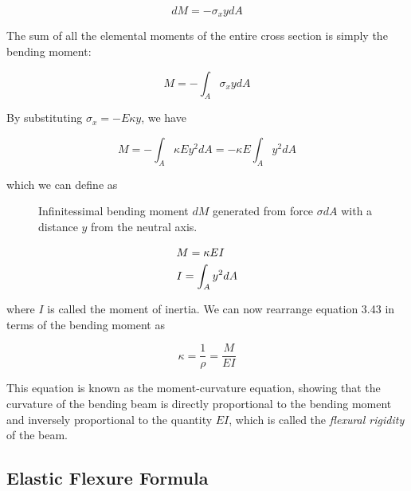 \documentclass[
10pt,
a4paper,
openany,
svgnames,
]{book} %
\begin{document}
\[dM =  - {\sigma _x}ydA\]

The sum of all the elemental moments of the entire cross section is simply the bending moment:

\[M =  - \int_A {{\sigma _x}ydA} \]

By substituting $\sigma_x = -E\kappa y$, we have

\[M =  - \int_A {\kappa E{y^2}dA}  =  - \kappa E\int_A {{y^2}dA} \]

which we can define as

\begin{figure}[h]
  \centering
  \caption{Infinitessimal bending moment $dM$ generated from force $\sigma dA$ with a distance $y$ from the neutral axis.}
\end{figure}


\[\begin{gathered}
  M = \kappa EI \hfill \\
  I = \int_A {{y^2}dA}  \hfill \\ 
\end{gathered} \]

where $I$ is called the moment of inertia. We can now rearrange equation 3.43 in terms of the bending moment as

\begin{equation} \label{eqn: moment-curvature}
  \kappa  = \frac{1}{\rho } = \frac{M}{{EI}}
\end{equation}

This equation is known as the moment-curvature equation, showing that the curvature of the bending beam is directly proportional to the bending moment and inversely proportional to the quantity $EI$, which is called the \emph{flexural rigidity} of the beam.

\subsection{Elastic Flexure Formula}
\end{document}
